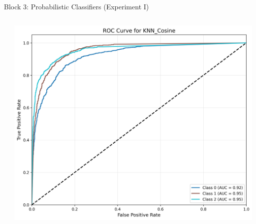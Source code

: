 \documentclass[9pt]{beamer}
\begin{document}
\begin{frame}{Block 3: Probabilistic Classifiers (Experiment I)}
\begin{columns}
\begin{column}{0.33\textwidth}
        \end{column}
        \begin{column}{0.33\textwidth}
            \centering
            \includegraphics[width=\textwidth]{code/ResultsMainAugZip/plots/Block3_Probabilistic_Experiment_I/roc_curve_KNN_Cosine.png}
        \end{column}
    \end{columns}
    \end{frame}
    
\end{document}
